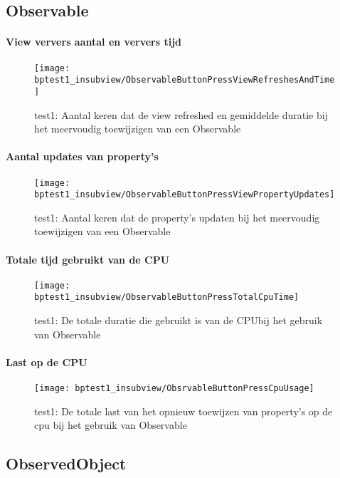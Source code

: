 \subsection{Observable}
\paragraph{View ververs aantal en ververs tijd}
\begin{figure}[H]
    \centering
    \texttt{[image: bptest1\_insubview/ObservableButtonPressViewRefreshesAndTime]} 
    \caption{test1: Aantal keren dat de view refreshed en gemiddelde duratie bij het meervoudig toewijzigen van een Observable}
    \label{fig:viewRefreshesObservable1}
\end{figure}
\paragraph{Aantal updates van property's}
\begin{figure}[H]
    \centering
    \texttt{[image: bptest1\_insubview/ObservableButtonPressViewPropertyUpdates]} 
    \caption{test1: Aantal keren dat de property's updaten bij het meervoudig toewijzigen van een Observable}
    \label{fig:propertyUpdatesObservable1}
\end{figure}
\paragraph{Totale tijd gebruikt van de CPU}
\begin{figure}[H]
    \centering
    \texttt{[image: bptest1\_insubview/ObservableButtonPressTotalCpuTime]} 
    \caption{test1: De totale duratie die gebruikt is van de CPUbij het gebruik van Observable}
    \label{fig:cpuUsageTimeObservable1}
\end{figure}
\paragraph{Last op de CPU}
\begin{figure}[H]
    \centering
    \texttt{[image: bptest1\_insubview/ObsrvableButtonPressCpuUsage]} 
    \caption{test1: De totale last van het opnieuw toewijzen van property's op de cpu bij het gebruik van Observable}
    \label{fig:cpuWeightObservable1}
\end{figure}

\subsection{ObservedObject}
